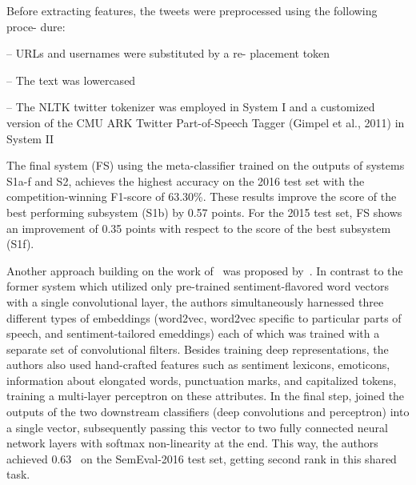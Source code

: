 Before extracting features, the tweets were preprocessed using the
following proce- dure:

-- URLs and usernames were substituted by a re- placement token

-- The text was lowercased

-- The NLTK twitter tokenizer was employed in System I and a
customized version of the CMU ARK Twitter Part-of-Speech Tagger
(Gimpel et al., 2011) in System II

The final system (FS) using the meta-classifier trained on the outputs
of systems S1a-f and S2, achieves the highest accuracy on the 2016
test set with the competition-winning F1-score of 63.30\%.  These
results improve the score of the best performing subsystem (S1b) by
0.57 points. For the 2015 test set, FS shows an improvement of 0.35
points with respect to the score of the best subsystem (S1f).


Another approach building on the work of~\citet{Severyn:15} was
proposed by~\citet{Rouvier:16}.  In contrast to the former system
which utilized only pre-trained sentiment-flavored word vectors with a
single convolutional layer, the authors simultaneously harnessed three
different types of embeddings (word2vec, word2vec specific to
particular parts of speech, and sentiment-tailored emeddings) each of
which was trained with a separate set of convolutional filters.
Besides training deep representations, the authors also used
hand-crafted features such as sentiment lexicons, emoticons,
information about elongated words, punctuation marks, and capitalized
tokens, training a multi-layer perceptron on these attributes.  In the
final step, \citeauthor{Rouvier:16} joined the outputs of the two
downstream classifiers (deep convolutions and perceptron) into a
single vector, subsequently passing this vector to two fully connected
neural network layers with softmax non-linearity at the end.  This
way, the authors achieved 0.63~\F{} on the SemEval-2016 test set,
getting second rank in this shared task.


